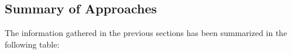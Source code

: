   \subsection{ Summary of Approaches }

  The information gathered in the previous sections has been summarized in the
  following table:

